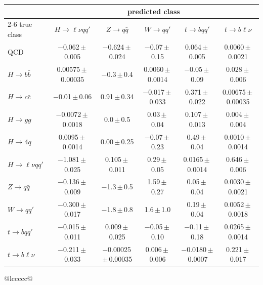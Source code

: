 \begin{landscape}
{\begin{center}
\begin{minipage}{\linewidth}
\begin{tabular*}{\linewidth}{@{\extracolsep{\fill}}lccccc@{}}
\midrule
 & \multicolumn{5}{c}{predicted class} \\
\cmidrule(lr){2-6}
true class & $H\to \ell\nu qq'$ & $Z\to q\bar q$ & $W\to qq'$ & $t\to bqq'$ & $t\to b\ell\nu$ \\
\midrule
QCD & $-$0.062\,$\pm$\,0.005 & $-$0.624\,$\pm$\,0.024 & $-$0.07\,$\pm$\,0.15 & 0.064\,$\pm$\,0.005 & 0.0060\,$\pm$\,0.0021 \\
$H\to b\bar b$ & 0.00575\,$\pm$\,0.00035 & $-$0.3\,$\pm$\,0.4 & 0.0060\,$\pm$\,0.0014 & $-$0.05\,$\pm$\,0.09 & 0.028\,$\pm$\,0.006 \\
$H\to c\bar c$ & $-$0.01\,$\pm$\,0.06 & 0.91\,$\pm$\,0.34 & $-$0.017\,$\pm$\,0.033 & 0.371\,$\pm$\,0.022 & 0.00675\,$\pm$\,0.00035 \\
$H\to gg$ & $-$0.0072\,$\pm$\,0.0018 & 0.0\,$\pm$\,0.5 & 0.03\,$\pm$\,0.04 & 0.107\,$\pm$\,0.013 & 0.004\,$\pm$\,0.004 \\
$H\to 4q$ & 0.0095\,$\pm$\,0.0014 & 0.00\,$\pm$\,0.25 & $-$0.07\,$\pm$\,0.23 & 0.49\,$\pm$\,0.04 & 0.0010\,$\pm$\,0.0014 \\
$H\to \ell\nu qq'$ & $-$1.081\,$\pm$\,0.025 & 0.105\,$\pm$\,0.011 & 0.29\,$\pm$\,0.05 & 0.0165\,$\pm$\,0.0014 & 0.646\,$\pm$\,0.006 \\
$Z\to q\bar q$ & $-$0.136\,$\pm$\,0.009 & $-$1.3\,$\pm$\,0.5 & 1.59\,$\pm$\,0.27 & 0.05\,$\pm$\,0.04 & 0.0030\,$\pm$\,0.0021 \\
$W\to qq'$ & $-$0.300\,$\pm$\,0.017 & $-$1.8\,$\pm$\,0.8 & 1.6\,$\pm$\,1.0 & 0.19\,$\pm$\,0.04 & 0.0052\,$\pm$\,0.0018 \\
$t\to bqq'$ & $-$0.015\,$\pm$\,0.011 & 0.009\,$\pm$\,0.025 & $-$0.05\,$\pm$\,0.10 & $-$0.11\,$\pm$\,0.18 & 0.0265\,$\pm$\,0.0014 \\
$t\to b\ell\nu$ & $-$0.211\,$\pm$\,0.033 & $-$0.00025\,$\pm$\,0.00035 & 0.006\,$\pm$\,0.006 & $-$0.0180\,$\pm$\,0.0007 & 0.221\,$\pm$\,0.017 \\
\bottomrule
\end{tabular*}
\end{minipage}
\end{center}
\newpage
\begin{center}
\begin{minipage}{\linewidth}\centering
{}
\par\smallskip
\begin{tabular*}{\linewidth}{@{\extracolsep{\fill}}lccccc@{}}
\toprule
{} \\

\end{tabular*}
\end{minipage}
\end{center}}
\end{landscape}
